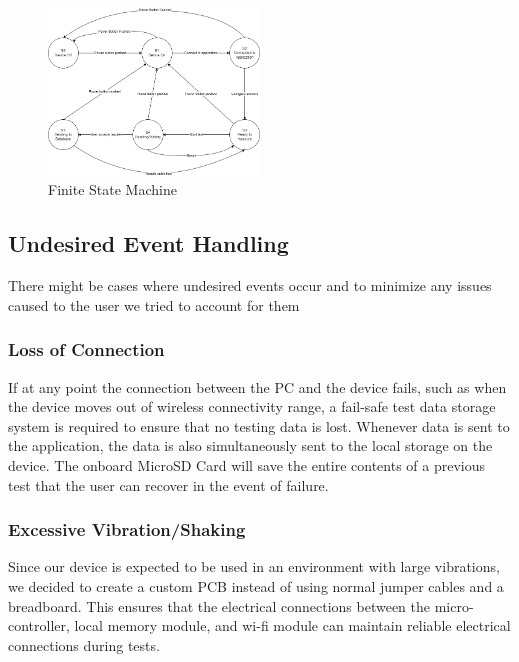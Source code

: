 \documentclass[12pt, titlepage]{article}
\begin{document}
\begin{figure}[h!]
  \begin{center}
  \includegraphics[width=0.5\textwidth]{state_machine_diagram.png}
  \caption{Finite State Machine}
  \end{center}
  \end{figure}
  \newpage

\subsection{Undesired Event Handling}
There might be cases where undesired events occur and to minimize any issues caused to the user we tried to account for them
\subsubsection{Loss of Connection}
If at any point the connection between the PC and the device fails, such as when the device moves out of wireless connectivity range, a fail-safe test data storage system is required to ensure that no testing data is lost. Whenever data is sent to the application, the data is also simultaneously sent to the local storage on the device. The onboard MicroSD Card will save the entire contents of a previous test that the user can recover in the event of failure.

\subsubsection{Excessive Vibration/Shaking}
Since our device is expected to be used in an environment with large vibrations, we decided to create a custom PCB instead of using normal jumper cables and a breadboard. This ensures that the electrical connections between the micro-controller, local memory module, and wi-fi module can maintain reliable electrical connections during tests.
\end{document}
